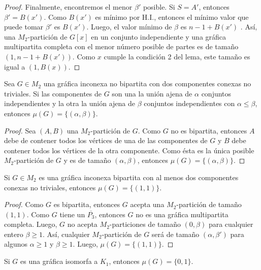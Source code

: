 \begin{proof}
Finalmente, encontremos el menor $\beta'$ posible. Si $S=A'$, entonces $\beta'=B(x')$. Como $B(x')$ es mínimo por H.I., entonces el mínimo valor que puede tomar $\beta'$ es $B(x')$. Luego, el valor mínimo de $\beta$ es $n-1+B(x')$ . Así, una $M_2$-partición de $G[x]$ en un conjunto independiente y una gráfica multipartita completa con el menor número posible de partes es de tamaño $(1,n-1+B(x'))$. Como $x$ cumple la condición 2 del lema, este tamaño es igual a $(1,B(x))$.

\end{proof}

\begin{lemma}\label{lema_parejas_04}
Sea $G\in M_2$ una gráfica inconexa no bipartita con dos componentes conexas no triviales. Si las componentes de $G$ son una la unión ajena de $\alpha$ conjuntos independientes y la otra la unión ajena de $\beta$ conjuntos independientes con $\alpha \le \beta$, entonces $\mu(G)=\{(\alpha,\beta)\}$.
\end{lemma}

\begin{proof}
Sea $(A,B)$ una $M_2$-partición de $G$. Como $G$ no es bipartita, entonces $A$ debe de contener todos los vértices de una de las componentes de $G$ y $B$ debe contener todos los vértices de la otra componente. Como ésta es la única posible $M_2$-partición de $G$ y es de tamaño $(\alpha, \beta)$, entonces $\mu(G)=\{(\alpha,\beta)\}$.
\end{proof}

\begin{lemma}\label{lema_parejas_05}
Si $G \in M_2$ es una gráfica inconexa bipartita con al menos dos componentes conexas no triviales, entonces $\mu(G)=\{(1,1)\}$.
\end{lemma}

\begin{proof}
Como $G$ es bipartita, entonces $G$ acepta una $M_2$-partición de tamaño
$(1,1)$. Como $G$ tiene un $\overline{P_3}$, entonces $G$ no es una gráfica
multipartita completa. Luego, $G$ no acepta $M_2$-particiones de tamaño
$(0,\beta)$ para cualquier entero $\beta \ge 1$. Así, cualquier
$M_2$-partición de $G$ será de tamaño $(\alpha,\beta')$ para algunos
$\alpha \ge 1$ y $\beta \ge 1$. Luego, $\mu(G)=\{(1,1)\}$.
\end{proof}

\begin{lemma}\label{lema_parejas_06}
Si $G$ es una gráfica isomorfa a $K_1$, entonces $\mu(G)=\{0,1\}$.
\end{lemma}

